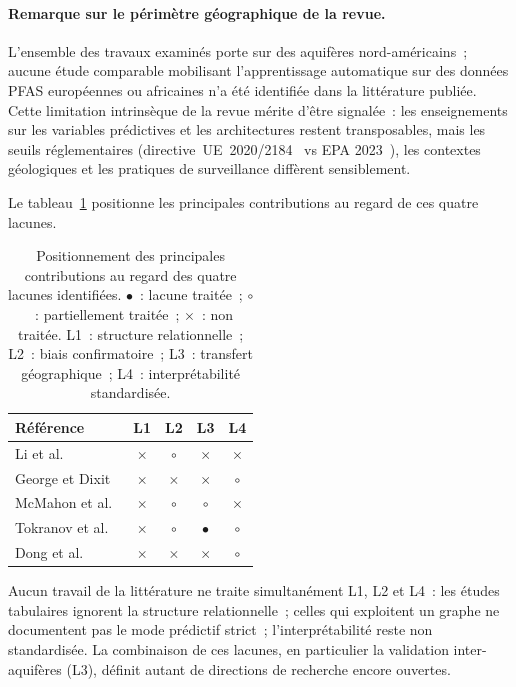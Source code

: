 \paragraph{Remarque sur le p\'erim\`etre g\'eographique de la revue.}
L'ensemble des travaux examin\'es porte sur des aquif\`eres nord-am\'ericains~; aucune \'etude comparable mobilisant l'apprentissage automatique sur des donn\'ees PFAS europ\'eennes ou africaines n'a \'et\'e identifi\'ee dans la litt\'erature publi\'ee.
Cette limitation intrins\`eque de la revue m\'erite d'\^etre signal\'ee~: les enseignements sur les variables pr\'edictives et les architectures restent transposables, mais les seuils r\'eglementaires (directive~UE~2020/2184~\cite{eu2020drinkingwater} vs EPA 2023~\cite{epa2023npdwr}), les contextes g\'eologiques et les pratiques de surveillance diff\`erent sensiblement.

Le tableau~\ref{tab:synthese-positionnement} positionne les principales contributions au regard de ces quatre lacunes.

\begin{table}[h!]
    \centering
    \caption{Positionnement des principales contributions au regard des quatre lacunes identifi\'ees. $\bullet$~: lacune trait\'ee~; $\circ$~: partiellement trait\'ee~; $\times$~: non trait\'ee. L1~: structure relationnelle~; L2~: biais confirmatoire~; L3~: transfert g\'eographique~; L4~: interpr\'etabilit\'e standardis\'ee.}
    \label{tab:synthese-positionnement}
    \small
    \begin{tabular}{lcccc}
        \hline
        R\'ef\'erence & L1 & L2 & L3 & L4 \\
        \hline
        Li et al.~\cite{li2022pfas}            & $\times$ & $\circ$ & $\times$ & $\times$ \\
        George et Dixit~\cite{george2021pfas}  & $\times$ & $\times$ & $\times$ & $\circ$ \\
        McMahon et al.~\cite{mcmahon2022pfas}  & $\times$ & $\circ$ & $\circ$  & $\times$ \\
        Tokranov et al.~\cite{tokranov2024pfas} & $\times$ & $\circ$ & $\bullet$ & $\circ$ \\
        Dong et al.~\cite{dong2024pfas}        & $\times$ & $\times$ & $\times$ & $\circ$ \\
        \hline
    \end{tabular}
\end{table}

Aucun travail de la litt\'erature ne traite simultan\'ement L1, L2 et L4~: les \'etudes tabulaires ignorent la structure relationnelle~; celles qui exploitent un graphe ne documentent pas le mode pr\'edictif strict~; l'interpr\'etabilit\'e reste non standardis\'ee.
La combinaison de ces lacunes, en particulier la validation inter-aquif\`eres (L3), d\'efinit autant de directions de recherche encore ouvertes.


